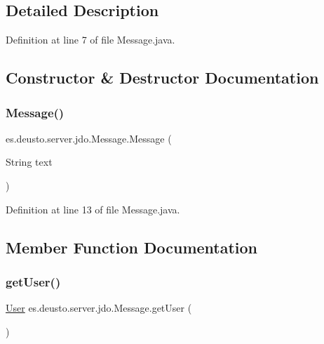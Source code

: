 \subsection{Detailed Description}


Definition at line 7 of file Message.\+java.



\subsection{Constructor \& Destructor Documentation}
\mbox{\label{classes_1_1deusto_1_1server_1_1jdo_1_1_message_ae3fb36faff2958657b6ba62ee6202499}} 
\subsubsection{\texorpdfstring{Message()}{Message()}}
{\footnotesize\ttfamily es.\+deusto.\+server.\+jdo.\+Message.\+Message (\begin{DoxyParamCaption}\item[{String}]{text }\end{DoxyParamCaption})}



Definition at line 13 of file Message.\+java.



\subsection{Member Function Documentation}
\mbox{\label{classes_1_1deusto_1_1server_1_1jdo_1_1_message_a927dc699f38b0c9cdc59620da7a5f7f2}} 
\subsubsection{\texorpdfstring{getUser()}{getUser()}}
{\footnotesize\ttfamily \mbox{\hyperlink{classes_1_1deusto_1_1server_1_1jdo_1_1_user}{User}} es.\+deusto.\+server.\+jdo.\+Message.\+get\+User (\begin{DoxyParamCaption}{ }\end{DoxyParamCaption})}



